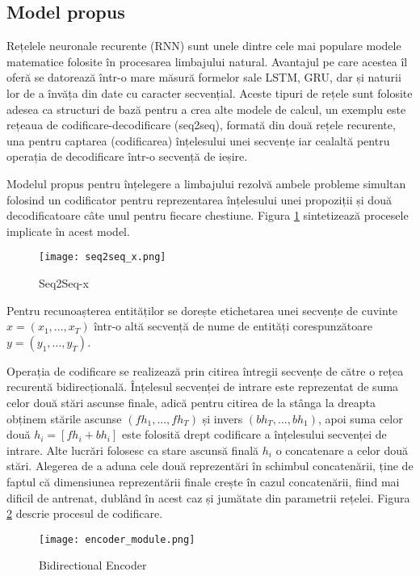 \subsection{Model propus}

Rețelele neuronale recurente (RNN) sunt unele dintre cele mai populare modele matematice folosite în procesarea limbajului natural. Avantajul pe care acestea îl oferă se datorează într-o mare măsură formelor sale LSTM, GRU, dar și naturii lor de a învăța din date cu caracter secvențial. Aceste tipuri de rețele sunt folosite adesea ca structuri de bază pentru a crea alte modele de calcul, un exemplu este rețeaua de codificare-decodificare (seq2seq), formată din două rețele recurente, una pentru captarea (codificarea) înțelesului unei secvențe iar cealaltă pentru operația de decodificare într-o secvență de ieșire.

Modelul propus pentru înțelegere a limbajului rezolvă ambele probleme simultan folosind un codificator pentru reprezentarea înțelesului unei propoziții și două decodificatoare câte unul pentru fiecare chestiune. Figura \ref{fig:seq2seq_x} sintetizează procesele implicate în acest model.

\begin{figure}[htbp]
	\centering
	\texttt{[image: seq2seq\_x.png]}
	\caption{Seq2Seq-x}
	\label{fig:seq2seq_x}
\end{figure}

Pentru recunoașterea entităților se dorește etichetarea unei secvențe de cuvinte $ x= (x_1, ..., x_T)$ într-o altă secvență de nume de entități corespunzătoare $ y=(y_1, ..., y_T) $.

Operația de codificare se realizează prin citirea întregii secvențe de către o rețea recurentă bidirecțională. Înțelesul secvenței de intrare este reprezentat de suma celor două stări ascunse finale, adică pentru citirea de la stânga la dreapta obținem stările ascunse $(fh_1, ..., fh_T)$ și invers $(bh_T, ..., bh_1)$, apoi suma celor două $h_i = [fh_i + bh_i]$ este folosită drept codificare a înțelesului secvenței de intrare. Alte lucrări \cite{joint_online_bing} folosesc ca stare ascunsă finală $h_i$ o concatenare a celor două stări. Alegerea de a aduna cele două reprezentări în schimbul concatenării, ține de faptul că dimensiunea reprezentării finale crește în cazul concatenării, fiind mai dificil de antrenat, dublând în acest caz și jumătate din parametrii rețelei. Figura \ref{fig:enc_module} descrie procesul de codificare.

\begin{figure}[h]
	\centering
	\texttt{[image: encoder\_module.png]}
	\caption{Bidirectional Encoder}
	\label{fig:enc_module}
\end{figure}

